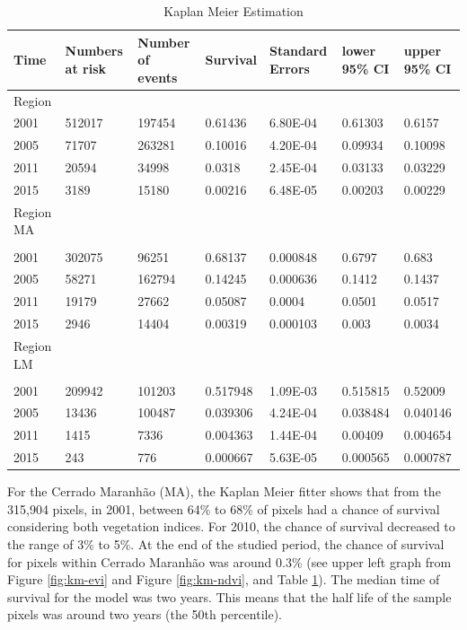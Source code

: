 \begin{table}[H]
\footnotesize
\caption{Kaplan Meier Estimation}
\begin{tabularx}{\linewidth}{l XXXXXX}
\hline
\hline
Time	&	Numbers at risk	&	Number of events	&	Survival 	&	Standard Errors  & lower 95\% CI & upper 95\% CI \\
\hline
Region  &&&&&& \\	
2001	&	512017	&	197454	&	0.61436	&	6.80E-04	&	0.61303	&	0.6157	\\
2005	&	71707	&	263281	&	0.10016	&	4.20E-04	&	0.09934	&	0.10098	\\
2011	&	20594	&	34998	&	0.0318	&	2.45E-04	&	0.03133	&	0.03229	\\
2015	&	3189	&	15180	&	0.00216	&	6.48E-05	&	0.00203	&	0.00229	\\
\hline
Region MA &&&&&& \\												\\
2001	&	302075	&	96251	&	0.68137	&	0.000848	&	0.6797	&	0.683	\\
2005	&	58271	&	162794	&	0.14245	&	0.000636	&	0.1412	&	0.1437	\\
2011	&	19179	&	27662	&	0.05087	&	0.0004	&	0.0501	&	0.0517	\\
2015	&	2946	&	14404	&	0.00319	&	0.000103	&	0.003	&	0.0034	\\
\hline
Region LM &&&&&& \\												\\
2001	&	209942	&	101203	&	0.517948	&	1.09E-03	&	0.515815	&	0.52009	\\
2005	&	13436	&	100487	&	0.039306	&	4.24E-04	&	0.038484	&	0.040146	\\
2011	&	1415	&	7336	&	0.004363	&	1.44E-04	&	0.00409	&	0.004654\\
2015	&	243	&	776	&	0.000667	&	5.63E-05	&	0.000565	&	0.000787\\
\hline
\hline
\end{tabularx}%
\label{tab:KM_estimate}%
\end{table}%

For the Cerrado Maranhão (MA), the Kaplan Meier fitter shows that from the 315,904 pixels, in 2001, between 64\% to 68\% of pixels had a chance of survival considering both vegetation indices. For 2010, the chance of survival decreased to the range of 3\% to 5\%. At the end of the studied period, the chance of survival for pixels within Cerrado Maranhão was around 0.3\% (see upper left graph from Figure \ref{fig:km-evi} and Figure \ref{fig:km-ndvi}, and Table \ref{tab:KM_estimate}). The median time of survival for the model was two years. This means that the half life of the sample pixels was around two years (the 50th percentile).

